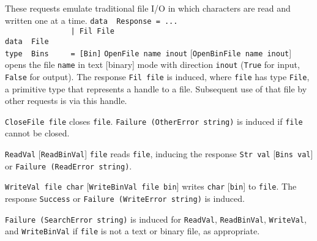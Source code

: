\begin{itemize}
These requests emulate traditional file I/O in which
characters are read and written one at a time.
\bprog
\mbox{\tt data\ \ Response\ =\ ...}\\
\mbox{\tt \ \ \ \ \ \ \ \ \ \ \ \ \ \ \ |\ Fil\ File}\\
\mbox{\tt data\ \ File}\\
\mbox{\tt type\ \ Bins\ \ \ \ \ =\ [Bin]}
\eprog
\mbox{\tt OpenFile\ name\ inout} [\mbox{\tt OpenBinFile\ name\ inout}]
opens the file \mbox{\tt name} in text [binary] mode with
direction \mbox{\tt inout} (\mbox{\tt True} for input, \mbox{\tt False} for output).
The response \mbox{\tt Fil\ file} is induced, where \mbox{\tt file} has type \mbox{\tt File}, a
primitive type that represents a handle to a file.
Subsequent use of that file by other requests is via this
handle.

\mbox{\tt CloseFile\ file} closes \mbox{\tt file}.  \mbox{\tt Failure\ (OtherError\ string)} is
induced if \mbox{\tt file} cannot be closed.

\mbox{\tt ReadVal} [\mbox{\tt ReadBinVal}] \mbox{\tt file} reads \mbox{\tt file}, inducing the response 
\mbox{\tt Str\ val} [\mbox{\tt Bins\ val}] or \mbox{\tt Failure\ (ReadError\ string)}.

\mbox{\tt WriteVal\ file\ char} [\mbox{\tt WriteBinVal\ file\ bin}] writes \mbox{\tt char} [\mbox{\tt bin}] to
\mbox{\tt file}.  The response \mbox{\tt Success} or \mbox{\tt Failure\ (WriteError\ string)} is
induced.

\mbox{\tt Failure\ (SearchError\ string)} is induced for \mbox{\tt ReadVal}, \mbox{\tt ReadBinVal},
\mbox{\tt WriteVal}, and \mbox{\tt WriteBinVal} if \mbox{\tt file} is not a text or
binary file, as appropriate.
\end{itemize}


